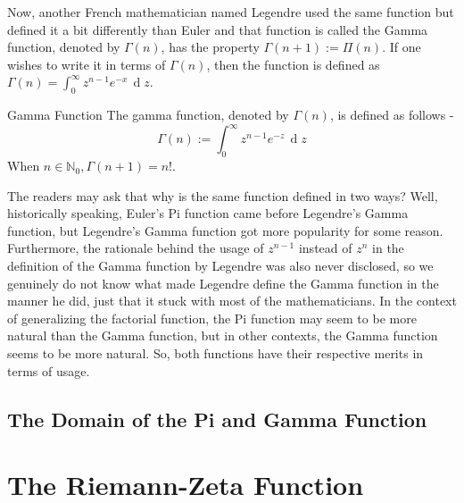 \noindent Now, another French mathematician named Legendre used the same function but defined it a bit differently than Euler and that function is called the Gamma function, denoted by $\Gamma(n)$, has the property $\Gamma(n+1):=\Pi(n)$. If one wishes to write it in terms of $\Gamma(n)$, then the function is defined as $\Gamma(n)=\int_0^{\infty}z^{n-1}e^{-x}\,\operatorname{d}z$.
\begin{Definition}{Gamma Function}\label{gamma_function}
	The gamma function, denoted by $\Gamma(n)$, is defined as follows - $$\Gamma(n):=\int_0^{\infty} z^{n-1}e^{-z}\,\operatorname{d}z$$ When $n\in\mathbb{N}_0,\Gamma(n+1)=n!$.
\end{Definition}
\noindent The readers may ask that why is the same function defined in two ways? Well, historically speaking, Euler's Pi function came before Legendre's Gamma function, but Legendre's Gamma function got more popularity for some reason. Furthermore, the rationale behind the usage of $z^{n-1}$ instead of $z^n$ in the definition of the Gamma function by Legendre was also never disclosed, so we genuinely do not know what made Legendre define the Gamma function in the manner he did, just that it stuck with most of the mathematicians. In the context of generalizing the factorial function, the Pi function may seem to be more natural than the Gamma function, but in other contexts, the Gamma function seems to be more natural. So, both functions have their respective merits in terms of usage.
\subsection{The Domain of the Pi and Gamma Function}
\section{The Riemann-Zeta Function}
